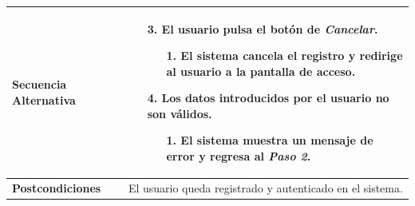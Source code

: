 \begin{longtable}{| p{4cm} | p{10cm} |}
\hline
\textbf{Secuencia Alternativa} &\mbox{}\par\vspace{-\baselineskip}
\begin{enumerate}[leftmargin=0.7cm, topsep=0.1cm]
\item[3.] El usuario pulsa el botón de \textit{Cancelar}.
	\begin{itemize}
	\item[1.] El sistema cancela el registro y redirige al usuario a la pantalla de acceso.
	\end{itemize}
\item[4.] Los datos introducidos por el usuario no son válidos.
	\begin{itemize}
	\item[1.] El sistema muestra un mensaje de error y regresa al \textit{Paso 2}.
	\end{itemize}
\end{enumerate}\\

\hline
\textbf{Postcondiciones} & 
El usuario queda registrado y autenticado en el sistema.\\
\hline
\end{longtable}




\newpage
